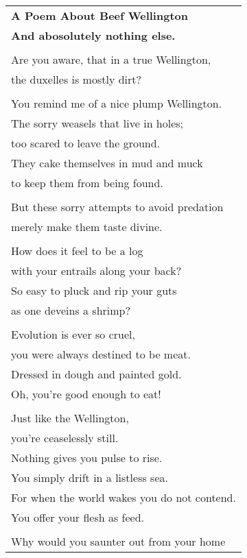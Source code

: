 \documentclass[empty]{article}
\begin{document}
\newcommand{\h}{\hspace*{4ex}}

\begin{center}
\begin{tabular}{l}
\textbf{A Poem About Beef Wellington} \\
{\footnotesize\textbf{And abosolutely nothing else.}} \\
\\
Are you aware, that in a true Wellington, \\
the duxelles is mostly dirt? \\
\\
You remind me of a nice plump Wellington. \\
The sorry weasels that live in holes; \\
too scared to leave the ground. \\
They cake themselves in mud and muck \\
to keep them from being found. \\
\\
But these sorry attempts to avoid predation \\
merely make them taste divine. \\
\\
How does it feel to be a log \\
with your entrails along your back? \\
So easy to pluck and rip your guts \\
as one deveins a shrimp? \\
\\
Evolution is ever so cruel, \\
you were always destined to be meat. \\
Dressed in dough and painted gold. \\
Oh, you're good enough to eat! \\
\\
Just like the Wellington, \\
you're ceaselessly still. \\
Nothing gives you pulse to rise. \\
You simply drift in a listless sea. \\
For when the world wakes you do not contend. \\
You offer your flesh as feed. \\
\\
Why would you saunter out from your home \\

\end{tabular}
\end{center}
\end{document}

